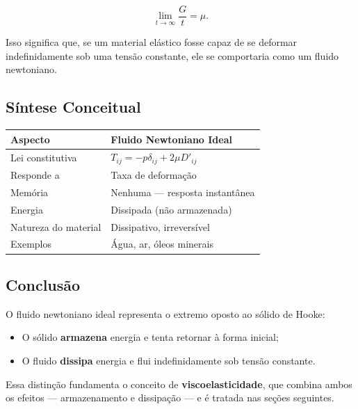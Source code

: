 \[
\lim_{t \to \infty} \frac{G}{t} = \mu.
\]

Isso significa que, se um material elástico fosse capaz de se deformar indefinidamente sob uma tensão constante, ele se comportaria como um fluido newtoniano.



\subsection{Síntese Conceitual}

\begin{center}
\begin{tabular}{|l|l|}
\hline
\textbf{Aspecto} & \textbf{Fluido Newtoniano Ideal} \\
\hline
Lei constitutiva & $T_{ij} = -p\delta_{ij} + 2\mu D'_{ij}$ \\
\hline
Responde a & Taxa de deformação \\
\hline
Memória & Nenhuma — resposta instantânea \\
\hline
Energia & Dissipada (não armazenada) \\
\hline
Natureza do material & Dissipativo, irreversível \\
\hline
Exemplos & Água, ar, óleos minerais \\
\hline
\end{tabular}
\end{center}



\subsection{Conclusão}

O fluido newtoniano ideal representa o extremo oposto ao sólido de Hooke:
\begin{itemize}
    \item O sólido \textbf{armazena} energia e tenta retornar à forma inicial;
    \item O fluido \textbf{dissipa} energia e flui indefinidamente sob tensão constante.
\end{itemize}

Essa distinção fundamenta o conceito de \textbf{viscoelasticidade}, que combina ambos os efeitos — armazenamento e dissipação — e é tratada nas seções seguintes.
